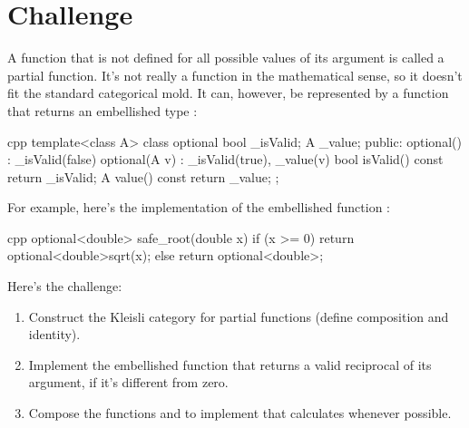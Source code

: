 \section{Challenge}

A function that is not defined for all possible values of its argument
is called a partial function. It's not really a function in the
mathematical sense, so it doesn't fit the standard categorical mold. It
can, however, be represented by a function that returns an embellished
type :

\begin{snip}{cpp}
template<class A>
class optional {
    bool _isValid;
    A _value;
public:
    optional()    : _isValid(false) {}
    optional(A v) : _isValid(true), _value(v) {}
    bool isValid() const { return _isValid; }
    A value() const { return _value; }
};
\end{snip}
For example, here's the implementation of the embellished function
:

\begin{snip}{cpp}
optional<double> safe_root(double x) {
    if (x >= 0) return optional<double>{sqrt(x)};
    else return optional<double>{};
}
\end{snip}
Here's the challenge:

\begin{enumerate}
  \tightlist
  \item
        Construct the Kleisli category for partial functions (define
        composition and identity).
  \item
        Implement the embellished function  that
        returns a valid reciprocal of its argument, if it's different from
        zero.
  \item
        Compose the functions  and  to implement
         that calculates 
        whenever possible.
\end{enumerate}
